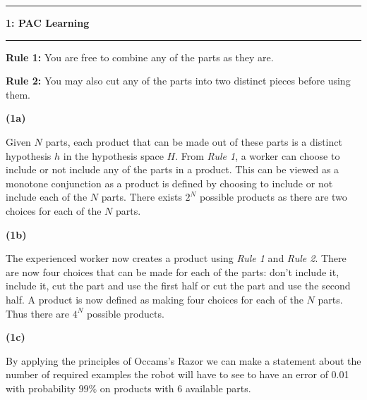 \documentclass[11pt]{article}
\newcommand\question[2]{\vspace{.25in}\hrule\textbf{#1: #2}\vspace{.5em}\hrule\vspace{.10in}}
\renewcommand\part[1]{\vspace{.10in}\textbf{(#1)}}
\begin{document}
\raggedright
\newcommand\NAME{Jake Pitkin}  %
\newcommand\UID{u0891770}     %
\newcommand\HWNUM{4}              %

\question{1}{PAC Learning}

\textbf{Rule 1:} You are free to combine any of the parts as they are.

\textbf{Rule 2:} You may also cut any of the parts into two distinct pieces before using them.

\part{1a} 

Given $N$ parts, each product that can be made out of these parts is a distinct hypothesis $h$ in the hypothesis space $H$. From \textit{Rule 1}, a worker can choose to include or not include any of the parts in a product. This can be viewed as a monotone conjunction as a product is defined by choosing to include or not include each of the $N$ parts. There exists $2^N$ possible products as there are two choices for each of the $N$ parts.
	

\part{1b}

	The experienced worker now creates a product using \textit{Rule 1} and \textit{Rule 2}. There are now four choices that can be made for each of the parts: don't include it, include it, cut the part and use the first half or cut the part and use the second half. A product is now defined as making four choices for each of the $N$ parts. Thus there are $4^N$ possible products.


\part{1c}

By applying the principles of Occams's Razor we can make a statement about the number of required examples the robot will have to see to have an error of 0.01 with probability $99\%$ on products with 6 available parts.
\end{document}
